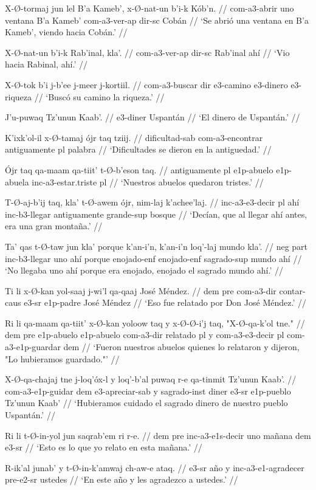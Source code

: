 \documentclass[12pt]{article}
\begin{document}
\ex
\begingl
  \gla  X-\O-tormaj jun lel B'a Kameb', x-\O-nat-un b'i-k K\'ob'n. //
  \glb com-a3-abrir uno ventana B'a Kameb' com-a3-ver-ap dir-sc Cob\'an //
  \glft `Se abri\'o una ventana en B'a Kameb', viendo hacia Cob\'an.' //
\endgl
\xe


\ex
\begingl
  \gla X-\O-nat-un b'i-k Rab'inal, kla'. //
  \glb com-a3-ver-ap dir-sc Rab'inal ah\'i //
  \glft `Vio hacia Rabinal, ah\'i.' //
\endgl
\xe

\ex
\begingl
  \gla  X-\O-tok b'i j-b'ee j-meer j-kortiil. //
  \glb com-a3-buscar dir e3-camino e3-dinero e3-riqueza //
  \glft `Busc\'o su camino la riqueza.' //
\endgl
\xe

\ex
\begingl
  \gla  J'u-puwaq Tz'unun Kaab'. //
  \glb e3-diner Uspant\'an //
  \glft `El dinero de Uspant\'an.' //
\endgl
\xe

\ex
\begingl
  \gla  K'ixk'ol-il x-\O-tamaj \'ojr taq tziij. //
  \glb  dificultad-sab com-a3-encontrar antiguamente pl palabra //
  \glft `Dificultades se dieron en la antiguedad.' //
\endgl
\xe

\ex
\begingl
  \gla \'Ojr taq qa-maam qa-tiit' t-\O-b'eson taq. //
  \glb antiguamente pl e1p-abuelo e1p-abuela inc-a3-estar.triste pl //
  \glft `Nuestros abuelos quedaron tristes.' //
\endgl
\xe


\ex
\begingl
  \gla T-\O-aj-b'ij taq, kla' t-\O-awem \'ojr, nim-laj k'achee'laj. //
  \glb inc-a3-e3-decir pl ah\'i inc-b3-llegar antiguamente grande-sup bosque //
  \glft `Dec\'ian, que al llegar ah\'i antes, era una gran monta\~na.' //
\endgl
\xe

\ex
\begingl
  \gla Ta' qas t-\O-taw jun kla' porque k'an-i'n, k'an-i'n loq'-laj mundo kla'. //
  \glb neg part inc-b3-llegar uno ah\'i porque enojado-enf enojado-enf sagrado-sup mundo ah\'i //
  \glft `No llegaba uno ah\'i porque era enojado, enojado el sagrado mundo ah\'i.' //
\endgl
\xe

\ex
\begingl
  \gla  Ti li x-\O-kan yol-saaj j-wi'l qa-qaaj Jos\'e M\'endez. //
  \glb dem pre com-a3-dir contar-caus e3-sr e1p-padre Jos\'e M\'endez //
  \glft `Eso fue relatado por Don Jos\'e M\'endez.' //
\endgl
\xe

\ex
\begingl
  \gla  Ri li qa-maam qa-tiit' x-\O-kan yoloow taq y x-\O-\O-i'j taq, "X-\O-qa-k'ol tne." //
  \glb  dem pre e1p-abuelo e1p-abuelo com-a3-dir relatado pl y com-a3-e3-decir pl com-a3-e1p-guardar dem //
  \glft `Fueron nuestros abuelos quienes lo relataron y dijeron, "Lo hubieramos guardado."' //
\endgl
\xe

\ex
\begingl
  \gla  X-\O-qa-chajaj tne j-loq'\'ox-l y loq'-b'al puwaq r-e qa-tinmit Tz'unun Kaab'. //
  \glb com-a3-e1p-guidar dem e3-apreciar-sab y sagrado-inst diner e3-sr e1p-pueblo Tz'unun Kaab' //
  \glft `Hubieramos cuidado el sagrado dinero de nuestro pueblo Uspant\'an.' //
\endgl
\xe

\ex
\begingl
  \gla  Ri li t-\O-in-yol jun saqrab'em ri r-e. //
  \glb dem pre inc-a3-e1s-decir uno ma\~nana dem e3-sr //
  \glft `Esto es lo que yo relato en esta ma\~nana.' //
\endgl
\xe

\ex
\begingl
  \gla  R-ik'al junab' y t-\O-in-k'amwaj ch-aw-e ataq. //
  \glb  e3-sr a\~no y inc-a3-e1-agradecer pre-e2-sr ustedes //
  \glft `En este a\~no y les agradezco a ustedes.' //
\endgl
\xe
\end{document}
